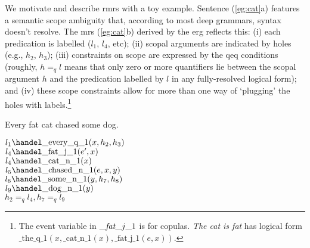 




%

We motivate and describe {\sc rmrs} with a toy
example.  Sentence 
(\ref{eg:cat}a) features a semantic scope ambiguity that, according to
most deep grammars, syntax
doesn't resolve.    The {\sc mrs} (\ref{eg:cat}b) derived by the
{\sc erg} \cite{copestake:flickinger:2000}
reflects this: (i) each predication is
labelled ($l_1$, $l_4$, etc); (ii) scopal arguments are indicated by
holes (e.g., $h_2$, $h_3$); (iii)
constraints on scope are expressed by the qeq conditions (roughly, $h
=_q l$ means that only zero or more quantifiers lie between the scopal
argument $h$ and the predication labelled by $l$ in any fully-resolved
logical form); and (iv) these scope
constraints allow for more than one way of `plugging' the holes with
labels.\footnote{The event variable in $\_\mbox{{\em fat}}\_j\_1$ is 
  for copulas. {\em The
    cat is fat} has logical form 
  $\mbox{\_the\_q\_1}(x,\mbox{\_cat\_n\_1}(x),\mbox{\_fat\_j\_1}(e,x))$.}
\begin{examples}
\item   \label{eg:cat}
\begin{subexamples}
\item
Every fat cat chased some dog.
\item   $l_1\handel\mbox{\_every\_q\_1}(x,h_2,h_3)$\\
$l_4\handel\mbox{\_fat\_j\_1}(e',x)$\\
$l_4\handel\mbox{\_cat\_n\_1}(x)$\\
$l_5\handel\mbox{\_chased\_n\_1}(e,x,y)$\\
$l_6\handel\mbox{\_some\_n\_1}(y,h_7,h_8)$\\
$l_9\handel\mbox{\_dog\_n\_1}(y)$\\
$h_2 =_q l_4, h_7 =_q l_9$
\end{subexamples}
\end{examples}
